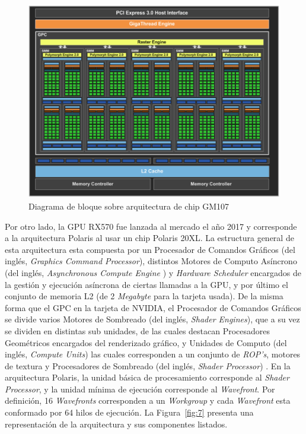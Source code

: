 \begin{figure}[h!]
    \centering
    \includegraphics[width=.8\textwidth]{Figures/nvidia.png}
    \caption{Diagrama de bloque sobre arquitectura de chip GM107}
    \label{fig:6}
\end{figure}


Por otro lado, la GPU RX570 fue lanzada al mercado el año 2017 y corresponde a la arquitectura Polaris al usar un chip Polaris 20XL. 
La estructura general de esta arquitectura esta compuesta por un Procesador de Comandos Gráficos (del inglés, \textit{Graphics Command Processor}), distintos Motores de Computo Asíncrono (del inglés, \textit{Asynchronous Compute Engine }) y \textit{Hardware Scheduler} encargados de la gestión y ejecución asíncrona de ciertas llamadas a la GPU, y por último el conjunto de memoria L2 (de 2 \textit{Megabyte} para la tarjeta usada).
De la misma forma que el GPC en la tarjeta de NVIDIA, el Procesador de Comandos Gráficos se divide varios Motores de Sombreado (del inglés, \textit{Shader Engines}), que a su vez se dividen en distintas sub unidades, de las cuales destacan Procesadores Geométricos encargados del renderizado gráfico, y Unidades de Computo (del inglés, \textit{Compute Units}) las cuales corresponden a un conjunto de \textit{ROP's}, motores de textura y Procesadores de Sombreado (del inglés, \textit{Shader Processor}) \cite{awhitepaper}.
En la arquitectura Polaris, la unidad básica de procesamiento corresponde al \textit{Shader Processor}, y la unidad mínima de ejecución corresponde al \textit{Wavefront}.
Por definición, 16 \textit{Wavefronts} corresponden a un \textit{Workgroup} y cada \textit{Wavefront} esta conformado por 64 hilos de ejecución.
La Figura~\ref{fig:7} presenta una representación de la arquitectura y sus componentes listados.

